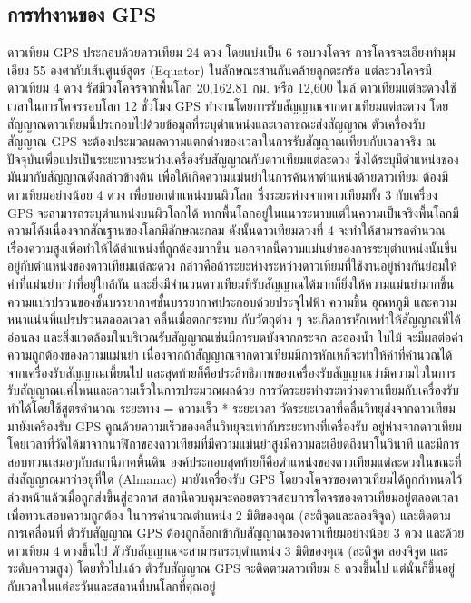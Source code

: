 \subsection{การทำงานของ GPS}
\quad ดาวเทียม GPS ประกอบด้วยดาวเทียม 24 ดวง โดยแบ่งเป็น 6 รอบวงโคจร การโคจรจะเอียงทำมุมเอียง 55 องศากับเส้นศูนย์สูตร (Equator) ในลักษณะสานกันคล้ายลูกตะกร้อ แต่ละวงโคจรมีดาวเทียม 4 ดวง รัศมีวงโคจรจากพื้นโลก 20,162.81 กม. หรือ 12,600 ไมล์ ดาวเทียมแต่ละดวงใช้ เวลาในการโคจรรอบโลก 12 ชั่วโมง 
\quad GPS ทำงานโดยการรับสัญญาณจากดาวเทียมแต่ละดวง โดยสัญญาณดาวเทียมนี้ประกอบไปด้วยข้อมูลที่ระบุตำแหน่งและเวลาขณะส่งสัญญาณ ตัวเครื่องรับสัญญาณ GPS จะต้องประมวลผลความแตกต่างของเวลาในการรับสัญญาณเทียบกับเวลาจริง ณ ปัจจุบันเพื่อแปรเป็นระยะทางระหว่างเครื่องรับสัญญาณกับดาวเทียมแต่ละดวง ซึ่งได้ระบุมีตำแหน่งของมันมากับสัญญาณดังกล่าวข้างต้น เพื่อให้เกิดความแม่นยำในการค้นหาตำแหน่งด้วยดาวเทียม ต้องมีดาวเทียมอย่างน้อย 4 ดวง เพื่อบอกตำแหน่งบนผิวโลก ซึ่งระยะห่างจากดาวเทียมทั้ง 3 กับเครื่อง GPS จะสามารถระบุตำแหน่งบนผิวโลกได้ หากพื้นโลกอยู่ในแนวระนาบแต่ในความเป็นจริงพื้นโลกมีความโค้งเนื่องจากสัณฐานของโลกมีลักษณะกลม ดังนั้นดาวเทียมดวงที่ 4 จะทำให้สามารถคำนวณเรื่องความสูงเพื่อทำให้ได้ตำแหน่งที่ถูกต้องมากขึ้น นอกจากนี้ความแม่นยำของการระบุตำแหน่งนั้นขึ้นอยู่กับตำแหน่งของดาวเทียมแต่ละดวง กล่าวคือถ้าระยะห่างระหว่างดาวเทียมที่ใช้งานอยู่ห่างกันย่อมให้ค่าที่แม่นยำกว่าที่อยู่ใกล้กัน และยิ่งมีจำนวนดาวเทียมที่รับสัญญาณได้มากก็ยิ่งให้ความแม่นยำมากขึ้น ความแปรปรวนของชั้นบรรยากาศชั้นบรรยากาศประกอบด้วยประจุไฟฟ้า ความชื้น อุณหภูมิ และความหนาแน่นที่แปรปรวนตลอดเวลา คลื่นเมื่อตกกระทบ กับวัตถุต่าง ๆ จะเกิดการหักเหทำให้สัญญาณที่ได้อ่อนลง และสิ่งแวดล้อมในบริเวณรับสัญญาณเช่นมีการบดบังจากกระจก ละอองน้ำ ใบไม้ จะมีผลต่อค่าความถูกต้องของความแม่นยำ เนื่องจากถ้าสัญญาณจากดาวเทียมมีการหักเหก็จะทำให้ค่าที่คำนวณได้จากเครื่องรับสัญญาณเพี้ยนไป และสุดท้ายก็คือประสิทธิภาพของเครื่องรับสัญญาณว่ามีความไวในการรับสัญญาณแค่ไหนและความเร็วในการประมวณผลด้วย 
\quad การวัดระยะห่างระหว่างดาวเทียมกับเครื่องรับทำได้โดยใช้สูตรคำนวณ ระยะทาง = ความเร็ว * ระยะเวลา วัดระยะเวลาที่คลื่นวิทยุส่งจากดาวเทียมมายังเครื่องรับ GPS คูณด้วยความเร็วของคลื่นวิทยุจะเท่ากับระยะทางที่เครื่องรับ อยู่ห่างจากดาวเทียม โดยเวลาที่วัดได้มาจากนาฬิกาของดาวเทียมที่มีความแม่นยำสูงมีความละเอียดถึงนาโนวินาที และมีการสอบทวนเสมอๆกับสถานีภาคพื้นดิน องค์ประกอบสุดท้ายก็คือตำแหน่งของดาวเทียมแต่ละดวงในขณะที่ส่งสัญญาณมาว่าอยู่ที่ใด (Almanac) มายังเครื่องรับ GPS โดยวงโคจรของดาวเทียมได้ถูกกำหนดไว้ล่วงหน้าแล้วเมื่อถูกส่งขึ้นสู่อวกาศ สถานีควบคุมจะคอยตรวจสอบการโคจรของดาวเทียมอยู่ตลอดเวลาเพื่อทวนสอบความถูกต้อง 
\quad ในการคำนวณตำแหน่ง 2 มิติของคุณ (ละติจูดและลองจิจูด) และติดตามการเคลื่อนที่ ตัวรับสัญญาณ GPS ต้องถูกล็อกเข้ากับสัญญาณของดาวเทียมอย่างน้อย 3 ดวง และด้วยดาวเทียม 4 ดวงขึ้นไป ตัวรับสัญญาณจะสามารถระบุตำแหน่ง 3 มิติของคุณ (ละติจูด ลองจิจูด และระดับความสูง) โดยทั่วไปแล้ว ตัวรับสัญญาณ GPS จะติดตามดาวเทียม 8 ดวงขึ้นไป แต่นั่นก็ขึ้นอยู่กับเวลาในแต่ละวันและสถานที่บนโลกที่คุณอยู่ 

